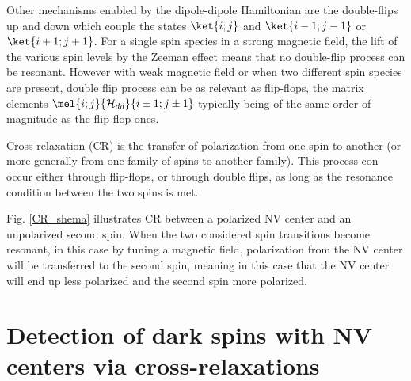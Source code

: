 \documentclass[a4paper]{report}
\begin{document}
Other mechanisms enabled by the dipole-dipole Hamiltonian are the double-flips up and down which couple the states $\ket{i;j}$ and $\ket{i-1;j-1}$ or $\ket{i+1;j+1}$. For a single spin species in a strong magnetic field, the lift of the various spin levels by the Zeeman effect means that no double-flip process can be resonant. However with weak magnetic field or when two different spin species are present, double flip process can be as relevant as flip-flops, the matrix elements $\mel{i;j}{\mathcal{H}_{dd}}{i\pm 1;j \pm 1}$ typically being of the same order of magnitude as the flip-flop ones.

Cross-relaxation (CR) is the transfer of polarization from one spin to another (or more generally from one family of spins to another family). This process con occur either through flip-flops, or through double flips, as long as the resonance condition between the two spins is met. 

Fig. \ref{CR_shema} illustrates CR between a polarized NV center and an unpolarized second spin. When the two considered spin transitions become resonant, in this case by tuning a magnetic field, polarization from the NV center will be transferred to the second spin, meaning in this case that the NV center will end up less polarized and the second spin more polarized.

\section{Detection of dark spins with NV centers via cross-relaxations}




\printbibliography
\end{document}
